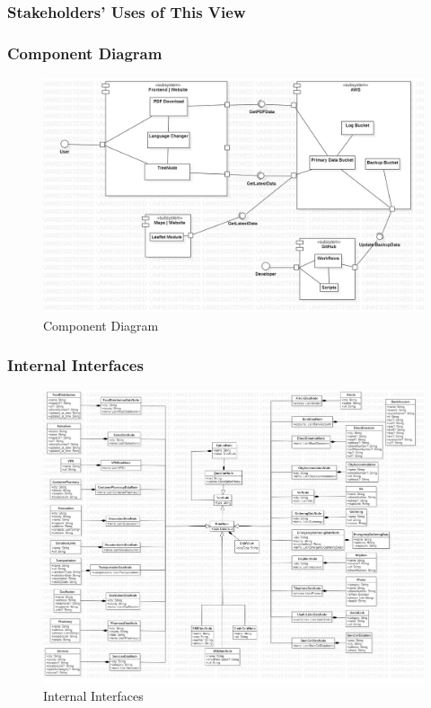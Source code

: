\subsubsection{Stakeholders' Uses of This View}

\subsubsection{Component Diagram}

\begin{figure}[H]
  \centering
  \includegraphics[width=\linewidth]{img/component-diagram.jpg}
  \caption{Component Diagram}
\end{figure}

\subsubsection{Internal Interfaces}

\begin{figure}[H]
  \centering
  \includegraphics[width=\linewidth]{img/internal-interfaces-diagram.jpg}
  \caption{Internal Interfaces}
\end{figure}


